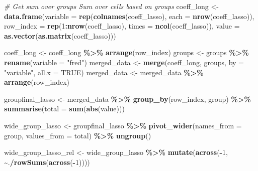 \documentclass[
]{article}
\newenvironment{Shaded}{\begin{snugshade}}{\end{snugshade}}
\newcommand{\AttributeTok}[1]{\textcolor[rgb]{0.13,0.29,0.53}{#1}}
\newcommand{\CommentTok}[1]{\textcolor[rgb]{0.56,0.35,0.01}{\textit{#1}}}
\newcommand{\ConstantTok}[1]{\textcolor[rgb]{0.56,0.35,0.01}{#1}}
\newcommand{\DecValTok}[1]{\textcolor[rgb]{0.00,0.00,0.81}{#1}}
\newcommand{\FunctionTok}[1]{\textcolor[rgb]{0.13,0.29,0.53}{\textbf{#1}}}
\newcommand{\NormalTok}[1]{#1}
\newcommand{\OtherTok}[1]{\textcolor[rgb]{0.56,0.35,0.01}{#1}}
\newcommand{\SpecialCharTok}[1]{\textcolor[rgb]{0.81,0.36,0.00}{\textbf{#1}}}
\newcommand{\StringTok}[1]{\textcolor[rgb]{0.31,0.60,0.02}{#1}}
\begin{document}
\begin{Shaded}
\begin{Highlighting}[]
\CommentTok{\# Get sum over groups Sum over cells based on groups}
\NormalTok{coeff\_long }\OtherTok{\textless{}{-}} \FunctionTok{data.frame}\NormalTok{(}\AttributeTok{variable =} \FunctionTok{rep}\NormalTok{(}\FunctionTok{colnames}\NormalTok{(coeff\_lasso),}
    \AttributeTok{each =} \FunctionTok{nrow}\NormalTok{(coeff\_lasso)), }\AttributeTok{row\_index =} \FunctionTok{rep}\NormalTok{(}\DecValTok{1}\SpecialCharTok{:}\FunctionTok{nrow}\NormalTok{(coeff\_lasso),}
    \AttributeTok{times =} \FunctionTok{ncol}\NormalTok{(coeff\_lasso)), }\AttributeTok{value =} \FunctionTok{as.vector}\NormalTok{(}\FunctionTok{as.matrix}\NormalTok{(coeff\_lasso)))}

\NormalTok{coeff\_long }\OtherTok{\textless{}{-}}\NormalTok{ coeff\_long }\SpecialCharTok{\%\textgreater{}\%}
    \FunctionTok{arrange}\NormalTok{(row\_index)}
\NormalTok{groups }\OtherTok{\textless{}{-}}\NormalTok{ groups }\SpecialCharTok{\%\textgreater{}\%}
    \FunctionTok{rename}\NormalTok{(}\AttributeTok{variable =} \StringTok{"fred"}\NormalTok{)}
\NormalTok{merged\_data }\OtherTok{\textless{}{-}} \FunctionTok{merge}\NormalTok{(coeff\_long, groups, }\AttributeTok{by =} \StringTok{"variable"}\NormalTok{, }\AttributeTok{all.x =} \ConstantTok{TRUE}\NormalTok{)}
\NormalTok{merged\_data }\OtherTok{\textless{}{-}}\NormalTok{ merged\_data }\SpecialCharTok{\%\textgreater{}\%}
    \FunctionTok{arrange}\NormalTok{(row\_index)}

\NormalTok{groupfinal\_lasso }\OtherTok{\textless{}{-}}\NormalTok{ merged\_data }\SpecialCharTok{\%\textgreater{}\%}
    \FunctionTok{group\_by}\NormalTok{(row\_index, group) }\SpecialCharTok{\%\textgreater{}\%}
    \FunctionTok{summarise}\NormalTok{(}\AttributeTok{total =} \FunctionTok{sum}\NormalTok{(}\FunctionTok{abs}\NormalTok{(value)))}

\NormalTok{wide\_group\_lasso }\OtherTok{\textless{}{-}}\NormalTok{ groupfinal\_lasso }\SpecialCharTok{\%\textgreater{}\%}
    \FunctionTok{pivot\_wider}\NormalTok{(}\AttributeTok{names\_from =}\NormalTok{ group, }\AttributeTok{values\_from =}\NormalTok{ total) }\SpecialCharTok{\%\textgreater{}\%}
    \FunctionTok{ungroup}\NormalTok{()}

\NormalTok{wide\_group\_lasso\_rel }\OtherTok{\textless{}{-}}\NormalTok{ wide\_group\_lasso }\SpecialCharTok{\%\textgreater{}\%}
    \FunctionTok{mutate}\NormalTok{(}\FunctionTok{across}\NormalTok{(}\SpecialCharTok{{-}}\DecValTok{1}\NormalTok{, }\SpecialCharTok{\textasciitilde{}}\NormalTok{.}\SpecialCharTok{/}\FunctionTok{rowSums}\NormalTok{(}\FunctionTok{across}\NormalTok{(}\SpecialCharTok{{-}}\DecValTok{1}\NormalTok{))))}


\end{Highlighting}
\end{Shaded}
\end{document}
